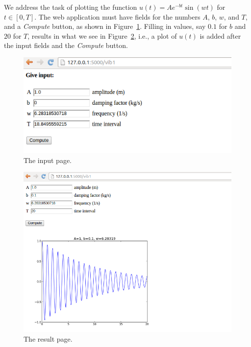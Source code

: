 \documentclass[%
oneside,                 %
final,                   %
10pt]{article}
\begin{document}
{We address the task of plotting the function $u(t)=Ae^{-bt}\sin (wt)$ for
$t\in [0,T]$. The web application must have fields for the numbers $A$,
$b$, $w$, and $T$, and a \emph{Compute} button, as shown in Figure~\ref{wf:vib1:flask:fig:input}. Filling in values, say $0.1$ for $b$ and
$20$ for $T$, results in what we see in Figure~\ref{wf:vib1:flask:fig:result},
i.e., a plot of $u(t)$ is added after the input fields and the \emph{Compute}
button.


\begin{figure}[ht]
  \centerline{\includegraphics[width=0.9\linewidth]{fig-web4sa/vib1_flask_input.png}}
  \caption{
  The input page. \label{wf:vib1:flask:fig:input}
  }
\end{figure}



\begin{figure}[ht]
  \centerline{\includegraphics[width=0.9\linewidth]{fig-web4sa/vib1_flask_output.png}}
  \caption{
  The result page. \label{wf:vib1:flask:fig:result}
  }
\end{figure}


}
\end{document}
